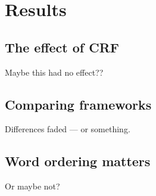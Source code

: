 
\section{Results}

\subsection{The effect of CRF}

Maybe this had no effect??


\subsection{Comparing frameworks}

Differences faded --- or something.


\subsection{Word ordering matters}

Or maybe not?


\pagebreak
